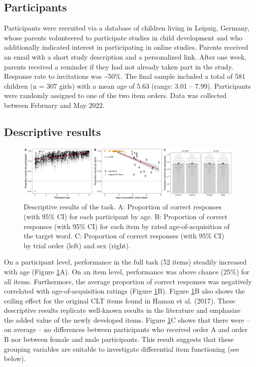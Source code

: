 \documentclass[
  man,floatsintext]{apa6}
\begin{document}
\hypertarget{participants}{%
\subsection{Participants}\label{participants}}

Participants were recruited via a database of children living in Leipzig, Germany, whose parents volunteered to participate studies in child development and who additionally indicated interest in participating in online studies. Parents received an email with a short study description and a personalized link. After one week, parents received a reminder if they had not already taken part in the study. Response rate to invitations was \textasciitilde50\%. The final sample included a total of 581 children (n = 307 girls) with a mean age of 5.63 (range: 3.01 -- 7.99). Participants were randomly assigned to one of the two item orders. Data was collected between February and May 2022.

\hypertarget{descriptive-results}{%
\subsection{Descriptive results}\label{descriptive-results}}



\begin{figure}

{\centering \includegraphics[width=1\linewidth]{../graphs/data_fig} 

}

\caption{Descriptive results of the task. A: Proportion of correct responses (with 95\% CI) for each participant by age. B: Proportion of correct responses (with 95\% CI) for each item by rated age-of-acquisition of the target word. C: Proportion of correct responses (with 95\% CI) by trial order (left) and sex (right).}\label{fig:fig2}
\end{figure}

On a participant level, performance in the full task (52 items) steadily increased with age (Figure \ref{fig:fig2}A). On an item level, performance was above chance (25\%) for all items. Furthermore, the average proportion of correct responses was negatively correlated with age-of-acquisition ratings (Figure \ref{fig:fig2}B). Figure \ref{fig:fig2}B also shows the ceiling effect for the original CLT items found in Haman et al. (2017). These descriptive results replicate well-known results in the literature and emphasize the added value of the newly developed items. Figure \ref{fig:fig2}C shows that there were -- on average -- no differences between participants who received order A and order B nor between female and male participants. This result suggests that these grouping variables are suitable to investigate differential item functioning (see below).
\end{document}
